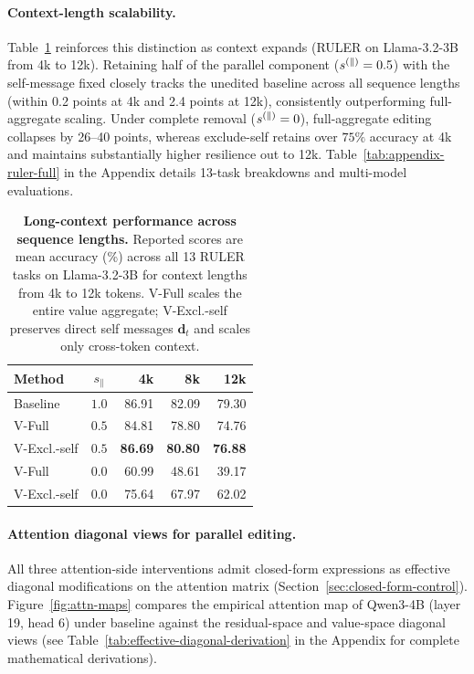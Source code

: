 \paragraph{Context-length scalability.}
Table~\ref{tab:longcontext-ruler} reinforces this distinction as context expands
(RULER on Llama-3.2-3B from 4k to 12k). Retaining half of the parallel component
($s^{(\parallel)}=0.5$) with the self-message fixed closely tracks the unedited baseline
across all sequence lengths (within 0.2 points at 4k and 2.4 points at 12k),
consistently outperforming full-aggregate scaling. Under complete removal
($s^{(\parallel)}=0$), full-aggregate editing collapses by 26--40 points, whereas
exclude-self retains over $75\%$ accuracy at 4k and maintains substantially higher
resilience out to 12k. Table~\ref{tab:appendix-ruler-full} in the Appendix
details 13-task breakdowns and multi-model evaluations.

\begin{table}[!htbp]
  \caption{\textbf{Long-context performance across sequence lengths.}
  Reported scores are mean accuracy (\%) across all 13 RULER tasks on
  Llama-3.2-3B for context lengths from 4k to 12k tokens. V-Full scales
  the entire value aggregate; V-Excl.-self preserves direct self messages
  $\mathbf{d}_t$ and scales only cross-token context.}
  \label{tab:longcontext-ruler}
  \centering
  \footnotesize
  \renewcommand{\arraystretch}{0.95}
  \begin{tabular*}{\linewidth}{@{\extracolsep{\fill}}lcrrr}
    \toprule
    Method & $s_\parallel$ & 4k & 8k & 12k \\
    \midrule
    Baseline & $1.0$ & 86.91 & 82.09 & 79.30 \\
    V-Full & $0.5$ & 84.81 & 78.80 & 74.76 \\
    V-Excl.-self & $0.5$ & \textbf{86.69} & \textbf{80.80} & \textbf{76.88} \\
    V-Full & $0.0$ & 60.99 & 48.61 & 39.17 \\
    V-Excl.-self & $0.0$ & 75.64 & 67.97 & 62.02 \\
    \bottomrule
  \end{tabular*}
\end{table}

\paragraph{Attention diagonal views for parallel editing.}
\label{sec:diagonal-validation}
All three attention-side interventions admit closed-form expressions as effective
diagonal modifications on the attention matrix (Section~\ref{sec:closed-form-control}).
Figure~\ref{fig:attn-maps} compares the empirical attention map of Qwen3-4B
(layer 19, head 6) under baseline against the residual-space and value-space
diagonal views (see Table~\ref{tab:effective-diagonal-derivation} in the Appendix
for complete mathematical derivations).

